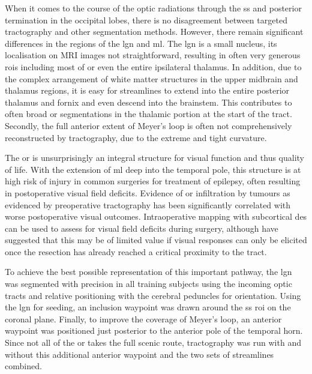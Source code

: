 When it comes to the course of the optic radiations through the \gls{ss} and posterior termination in the occipital lobes, there is no disagreement between targeted tractography and other segmentation methods.
However, there remain significant differences in the regions of the \gls{lgn} and \gls{ml}.
The \gls{lgn} is a small nucleus, its localisation on MRI images not straightforward, resulting in often very generous \glspl{roi} including most of or even the entire ipsilateral thalamus.
In addition, due to the complex arrangement of white matter structures in the upper midbrain and thalamus regions, it is easy for streamlines to extend into the entire posterior thalamus and fornix and even descend into the brainstem.
This contributes to often broad \gls{or} segmentations in the thalamic portion at the start of the tract.
Secondly, the full anterior extent of Meyer's loop is often not comprehensively reconstructed by tractography, due to the extreme and tight curvature.\autocite{Lilja2015,Chamberland2018}

The \gls{or} is unsurprisingly an integral structure for visual function and thus quality of life.
With the extension of \gls{ml} deep into the temporal pole, this structure is at high risk of injury in common surgeries for treatment of epilepsy, often resulting in postoperative visual field deficits.\autocite{Lacerda2020}
Evidence of \gls{or} infiltration by tumours as evidenced by preoperative tractography has been significantly correlated with worse postoperative visual outcomes.\autocite{Soumpasis2023}
Intraoperative mapping with subcortical \gls{des} can be used to assess for visual field deficits during surgery,\autocite{Duffau2004a,Mazerand2017} although \textcite{Shahar2018} have suggested that this may be of limited value if visual responses can only be elicited once the resection has already reached a critical proximity to the tract.

To achieve the best possible representation of this important pathway, the \gls{lgn} was segmented with precision in all training subjects using the incoming optic tracts and relative positioning with the cerebral peduncles for orientation.
Using the \gls{lgn} for seeding, an inclusion waypoint was drawn around the \gls{ss} \gls{roi} on the coronal plane.
Finally, to improve the coverage of Meyer's loop, an anterior waypoint was positioned just posterior to the anterior pole of the temporal horn.
Since not all of the \gls{or} takes the full scenic route, tractography was run with and without this additional anterior waypoint and the two sets of streamlines combined.

